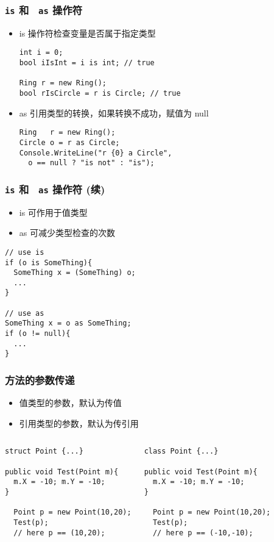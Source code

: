 \begin{frame}[fragile]
\frametitle{\texttt{is} 和 ~\texttt{as} 操作符}
\begin{itemize}
\item is 操作符检查变量是否属于指定类型
\begin{lstlisting}
int i = 0;
bool iIsInt = i is int; // true

Ring r = new Ring();
bool rIsCircle = r is Circle; // true
\end{lstlisting}
\pause
\item as 引用类型的转换，如果转换不成功，赋值为 null
\begin{lstlisting}
Ring   r = new Ring();
Circle o = r as Circle;
Console.WriteLine("r {0} a Circle",
  o == null ? "is not" : "is");
\end{lstlisting}
\end{itemize}
\end{frame}

\begin{frame}[fragile]
\frametitle{\texttt{is} 和 ~\texttt{as} 操作符 (续)}
\begin{itemize}
\item is 可作用于值类型
\item as 可减少类型检查的次数
\end{itemize}
\begin{lstlisting}
// use is
if (o is SomeThing){
  SomeThing x = (SomeThing) o;
  ...
}

// use as
SomeThing x = o as SomeThing;
if (o != null){
  ...
}

\end{lstlisting}
\end{frame}

\begin{frame}[fragile]
\frametitle{方法的参数传递}
\begin{itemize}
\item 值类型的参数，默认为{\redwarn 传值}
\item 引用类型的参数，默认为{\redwarn 传引用}
\end{itemize}
\begin{columns}
\begin{lstlisting}
struct Point {...}

public void Test(Point m){
  m.X = -10; m.Y = -10;
}

  Point p = new Point(10,20);
  Test(p);
  // here p == (10,20);
\end{lstlisting}
\begin{lstlisting}
class Point {...}

public void Test(Point m){
  m.X = -10; m.Y = -10;
}

  Point p = new Point(10,20);
  Test(p);
  // here p == (-10,-10);
\end{lstlisting}
\end{columns}
\end{frame}

